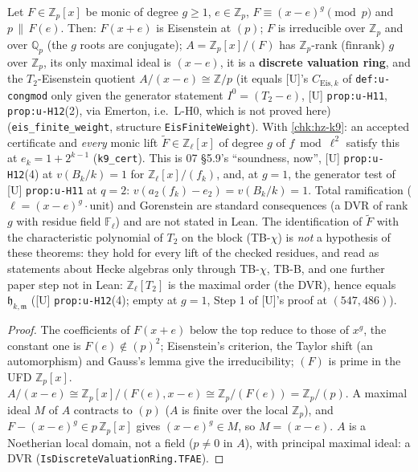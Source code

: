 \begin{lemma}\label{inf:hz-k9-eis}
  \leanok
  Let $F\in\mathbb Z_p[x]$ be monic of degree $g\ge1$, $e\in\mathbb Z_p$, $F\equiv(x-e)^g\pmod p$ and $p\,\|\,F(e)$. Then: $F(x+e)$ is Eisenstein
  at $(p)$; $F$ is irreducible over $\mathbb Z_p$ and over $\mathbb Q_p$ (the $g$ roots are conjugate); $A=\mathbb Z_p[x]/(F)$ has $\mathbb Z_p$-rank ($\mathrm{finrank}$) $g$
  over $\mathbb Z_p$, its only maximal ideal is $(x-e)$, it is a \textbf{discrete valuation ring}, and the $T_2$-Eisenstein quotient
  $A/(x-e)\cong\mathbb Z/p$ (it equals [U]'s $C_{\mathrm{Eis},k}$ of \texttt{def:u-congmod} only given the generator statement $I^0=(T_2-e)$, [U] \texttt{prop:u-H11}, \texttt{prop:u-H12}(2), via Emerton, i.e.\ L-H0, which is not proved here) (\texttt{eis\_finite\_weight}, structure \texttt{EisFiniteWeight}). With \ref{chk:hz-k9}: an accepted certificate and
  \emph{every} monic lift $\tilde F\in\mathbb Z_\ell[x]$ of degree $g$ of $f\bmod\ell^2$ satisfy this at $e_k=1+2^{k-1}$ (\texttt{k9\_cert}). This is 07
  \S5.9's ``soundness, now'', [U] \texttt{prop:u-H12}(4) at $v(B_k/k)=1$ for $\mathbb Z_\ell[x]/(f_k)$, and, at $g=1$, the generator test of [U]
  \texttt{prop:u-H11} at $q=2$: $v(a_2(f_k)-e_2)=v(B_k/k)=1$. Total ramification ($\ell=(x-e)^g\cdot$unit) and Gorenstein are standard consequences
  (a DVR of rank $g$ with residue field $\mathbb F_\ell$) and are not stated in Lean. The identification of $\tilde F$ with the characteristic
  polynomial of $T_2$ on the block (TB-$\chi$) is \emph{not} a hypothesis of these theorems: they hold for every lift of the checked residues, and
  read as statements about Hecke algebras only through TB-$\chi$, TB-B, and one further paper step not in Lean: $\mathbb Z_\ell[T_2]$ is the maximal order (the DVR), hence equals $\mathfrak h_{k,\mathfrak m}$ ([U] \texttt{prop:u-H12}(4); empty at $g=1$, Step 1 of [U]'s proof at $(547,486)$).
\end{lemma}
\begin{proof}
  \leanok
  The coefficients of $F(x+e)$ below the top reduce to those of $x^g$, the constant one is $F(e)\notin(p)^2$; Eisenstein's criterion, the
  Taylor shift (an automorphism) and Gauss's lemma give the irreducibility; $(F)$ is prime in the UFD $\mathbb Z_p[x]$. $A/(x-e)\cong
  \mathbb Z_p[x]/(F(e),x-e)\cong\mathbb Z_p/(F(e))=\mathbb Z_p/(p)$. A maximal ideal $M$ of $A$ contracts to $(p)$ ($A$ is finite over the local
  $\mathbb Z_p$), and $F-(x-e)^g\in p\,\mathbb Z_p[x]$ gives $(x-e)^g\in M$, so $M=(x-e)$. $A$ is a Noetherian local domain, not a field ($p\ne0$
  in $A$), with principal maximal ideal: a DVR (\texttt{IsDiscreteValuationRing.TFAE}).
\end{proof}

